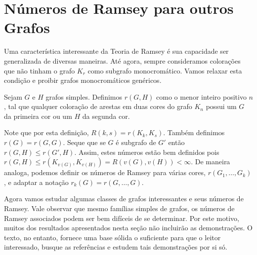 
\chapter{Números de Ramsey para outros Grafos}
\label{chap:graph}


Uma característica interessante da Teoria de Ramsey é sua capacidade ser generalizada de diversas maneiras. Até agora, sempre consideramos colorações que não tinham o grafo $K_r$ como subgrafo monocromático. Vamos relaxar esta condição e proibir grafos monocromáticos genéricos.

\begin{definition}
Sejam $G$ e $H$ grafos simples. Definimos $r(G,H)$ como o menor inteiro positivo $n$, tal que qualquer coloração de arestas em duas cores do grafo $K_n$ possui um $G$ da primeira cor ou um $H$ da segunda cor.
\end{definition}

Note que por esta definição, $R(k,s) = r(K_k, K_s)$. Também definimos $r(G) = r(G,G)$. Seque que se $G$ é subgrafo de $G'$ então $r(G,H) \leq r(G',H)$. Assim, estes números estão bem definidos pois $r(G,H) \leq r(K_{v(G)}, K_{v(H)}) = R(v(G), v(H)) < \infty$. De maneira analoga, podemos definir os números de Ramsey para várias cores, $r(G_1, \dots, G_k)$, e adaptar a notação $r_k(G) = r(G,\dots,G)$.

Agora vamos estudar algumas classes de grafos interessantes e seus números de Ramsey. Vale observar que mesmo famílias simples de grafos, os números de Ramsey associados podem ser bem difíceis de se determinar. Por este motivo, muitos dos resultados apresentados nesta seção não incluirão as demonstrações. O texto, no entanto, fornece uma base sólida o suficiente para que o leitor interessado, busque as referências e estudem tais demonstrações por si só.


